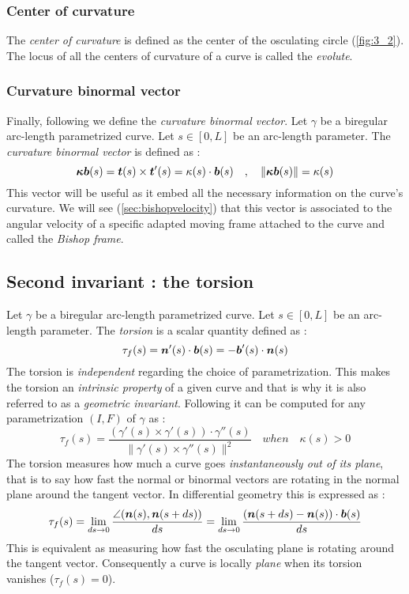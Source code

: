 \subsubsection{Center of curvature}
The \emph{center of curvature} is defined as the center of the osculating circle (\cref{fig:3_2}). The locus of all the centers of curvature of a curve is called the \emph{evolute}.

\subsubsection{Curvature binormal vector}
Finally, following \cite{Bergou2008} we define the \emph{curvature binormal vector}. Let $\gamma$ be a biregular arc-length parametrized curve. Let $s\in [0,L]$ be an arc-length parameter. The \emph{curvature binormal vector} is defined as :
\begin{equation}
	\boldsymbol{\kappa b}(s) = \boldsymbol{t}(s) \times \boldsymbol{t}'(s) = \kappa(s)\cdot\boldsymbol{b}(s)
	\quad,\quad
	\|\boldsymbol{\kappa b}(s)\|= \kappa(s)
\label{eq:kb}
\end{equation}
This vector will be useful as it embed all the necessary information on the curve's curvature. We will see (\cref{sec:bishopvelocity}) that this vector is associated to the angular velocity of a specific adapted moving frame attached to the curve and called the \emph{Bishop frame}.

\subsection{Second invariant : the torsion}\label{sec:torsion}
Let $\gamma$ be a biregular arc-length parametrized curve. Let $s \in [0,L]$ be an arc-length parameter. The \emph{torsion} is a scalar quantity defined as :
\begin{equation}
	\tau_f(s) = \boldsymbol{n}'(s) \cdot \boldsymbol{b}(s) = - \boldsymbol{b}'(s) \cdot \boldsymbol{n}(s)
\end{equation}
The torsion is \emph{independent} regarding the choice of parametrization. This makes the torsion an \emph{intrinsic property} of a given curve and that is why it is also referred to as a \emph{geometric invariant}. Following \cite[p.204]{Gray2006} it can be computed for any parametrization $(I,F)$ of $\gamma$ as :
\begin{equation}
	\tau_f(s) = \frac{(\gamma'(s) \times \gamma'(s)) \cdot \gamma''(s)}{\|\gamma'(s) \times \gamma''(s)\|^2}
	\quad when \quad
	\kappa(s) > 0
\end{equation}
The torsion measures how much a curve goes \emph{instantaneously out of its plane}, that is to say how fast the normal or binormal vectors are rotating in the normal plane around the tangent vector. In differential geometry this is expressed as :
\begin{equation}
	\tau_f(s) 
	= \lim_{ds \to 0}\frac{\angle(\boldsymbol{n}(s),\boldsymbol{n}(s+ds))}{ds}
	= \lim_{ds \to 0}\frac{(\boldsymbol{n}(s+ds) - \boldsymbol{n}(s)) \cdot \boldsymbol{b}(s)}{ds}
\end{equation}
This is equivalent as measuring how fast the osculating plane is rotating around the tangent vector. Consequently a curve is locally \emph{plane} when its torsion vanishes ($\tau_f(s) = 0$).

